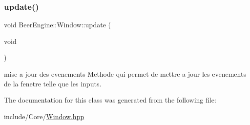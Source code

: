 \subsubsection{\texorpdfstring{update()}{update()}}
{\footnotesize\ttfamily void Beer\+Engine\+::\+Window\+::update (\begin{DoxyParamCaption}\item[{void}]{ }\end{DoxyParamCaption})}



mise a jour des evenements Methode qui permet de mettre a jour les evenements de la fenetre telle que les inputs. 



The documentation for this class was generated from the following file\+:\begin{DoxyCompactItemize}
\item 
include/\+Core/\mbox{\hyperlink{_window_8hpp}{Window.\+hpp}}\end{DoxyCompactItemize}

